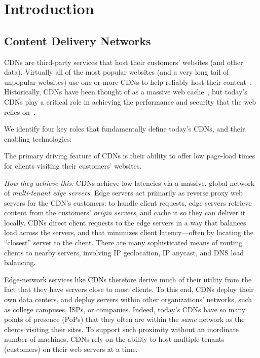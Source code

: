 \section{Introduction}
\label{sec:intro}
%


\subsection{Content Delivery Networks} %

CDNs are third-party services that host their customers' websites (and
other data).
%
Virtually all of the most popular websites (and a very long tail of
unpopular websites) use one or more CDNs to help reliably host their
content~\cite{key-sharing}.
%
Historically, CDNs have been thought of as a massive web
cache~\cite{cdn-on-demand}, but today's CDNs play a critical role in
achieving the performance and security that the web relies
on~\cite{securing-cdns}.


We identify four key roles that fundamentally define today's CDNs, and
their enabling technologies:

%
The primary driving feature of CDNs is their ability to offer low
page-load times for clients visiting their customers' websites.
	
\smallskip\noindent
%
\emph{How they achieve this:}
%
CDNs achieve low latencies via a massive, global network of
\emph{multi-tenant edge servers}.
%
Edge servers act primarily as reverse proxy web servers for the CDN's
customers: to handle client requests, edge servers retrieve content
from the customers' \emph{origin servers}, and cache it so they can
deliver it locally.
%
CDNs direct client requests to the edge servers in a way that balances
load across the servers, and that minimizes client latency---often by
locating the ``closest'' server to the client.
%
There are many sophisticated means of routing clients to nearby
servers, involving IP geolocation, IP anycast, and DNS load
balancing.


Edge-network services like CDNs therefore derive much of their utility
from the fact that they have servers close to most clients.
%
To this end, CDNs deploy their own data centers, and deploy servers
within other organizations' networks, such as college campuses, ISPs,
or companies.
%
Indeed, today's CDNs have so many points of presence (PoPs) that they
often are within the \emph{same} network as the clients visiting their
sites.
%
To support such proximity without an inordinate number of machines,
CDNs rely on the ability to host multiple tenants (customers) on
their web servers at a time.

